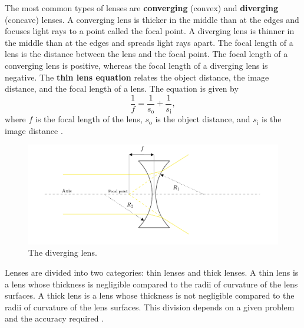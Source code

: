 \documentclass[10pt]{article}
\begin{document}
The most common types of lenses are \textbf{converging} (convex) and \textbf{diverging} (concave) lenses. A converging lens is thicker in the middle than at the edges and focuses light rays to a point called the focal point. A diverging lens is thinner in the middle than at the edges and spreads light rays apart. The focal length of a lens is the distance between the lens and the focal point. The focal length of a converging lens is positive, whereas the focal length of a diverging lens is negative. The \textbf{thin lens equation} relates the object distance, the image distance, and the focal length of a lens. The equation is given by
\begin{equation}
  \label{eq:1}
  \frac{1}{f} = \frac{1}{s_{\text{o}}} + \frac{1}{s_{\text{i}}},
\end{equation}
where $f$ is the focal length of the lens, $s_{\text{o}}$ is the object distance, and $s_{\text{i}}$ is the image distance \cite{Pedrotti_2006}.  

\begin{figure}[hbt!]
  \centering
  \includegraphics[scale=0.5]{figures/f2.pdf}
  \caption{The diverging lens.}
  \label{fig:2}
\end{figure}

Lenses are divided into two categories: thin lenses and thick lenses. A thin lens is a lens whose thickness is negligible compared to the radii of curvature of the lens surfaces. A thick lens is a lens whose thickness is not negligible compared to the radii of curvature of the lens surfaces. This division depends on a given problem and the accuracy required \cite{Hecht_2017}. 
\end{document}
